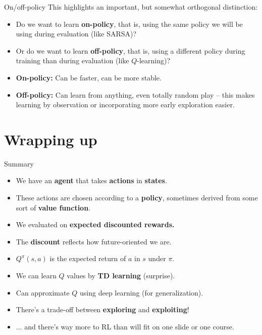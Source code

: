 \documentclass{beamer}
\begin{document}
\begin{frame}{On/off-policy}
This highlights an important, but somewhat orthogonal distinction: \vspace{-1.5em} 
\begin{itemize}
    \item<2-> Do we want to learn \textbf{on-policy}, that is, using the same policy we will be using during evaluation (like SARSA)?
    \item<3-> Or do we want to learn \textbf{off-policy}, that is, using a different policy during training than during evaluation (like \(Q\)-learning)?
\end{itemize}
\begin{itemize}
    \item<5-> \textbf{On-policy:} Can be faster, can be more stable. 
    \item<6-> \textbf{Off-policy:} Can learn from anything, even totally random play -- this makes learning by observation or incorporating more early exploration easier.
\end{itemize}
\end{frame}

\section{Wrapping up}

\begin{frame}{Summary}
\begin{itemize}
\item We have an \textbf{agent} that takes \textbf{actions} in \textbf{states}. 
\item<2-> These actions are chosen according to a \textbf{policy}, sometimes derived from some sort of \textbf{value function}. 
\item<3-> We evaluated on \textbf{expected discounted rewards.}
\item<4-> The \textbf{discount} reflects how future-oriented we are.
\item<5-> \(Q^\pi(s,a)\) is the expected return of \(a\) in \(s\) under \(\pi\).
\item<6-> We can learn \(Q\) values by \textbf{TD learning} (surprise).
\item<7-> Can approximate \(Q\) using deep learning (for generalization). 
\item<8-> There's a trade-off between \textbf{exploring} and \textbf{exploiting}!
\item<9-> ... and there's way more to RL than will fit on one slide or one course.
\end{itemize}
\end{frame}
\end{document}
